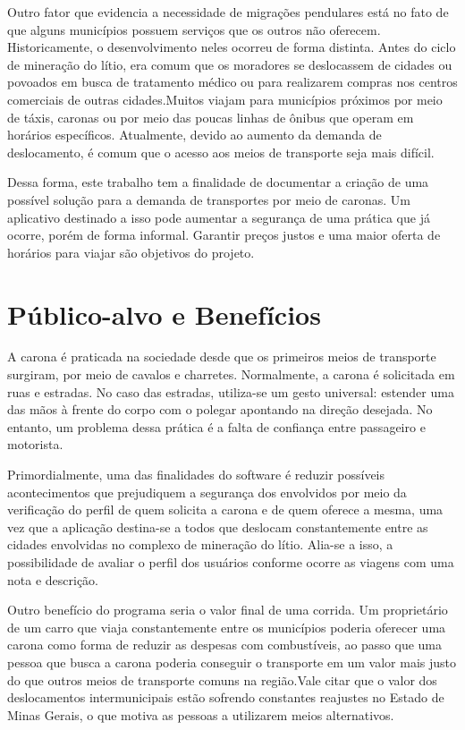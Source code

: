 Outro fator que evidencia a necessidade de migrações pendulares está no fato de que alguns municípios possuem serviços que os outros não oferecem. Historicamente, o desenvolvimento neles ocorreu de forma distinta. Antes do ciclo de mineração do lítio, era comum que os moradores se deslocassem de cidades ou povoados em busca de tratamento médico ou para realizarem compras nos centros comerciais de outras cidades.Muitos viajam para municípios próximos por meio de táxis, caronas ou por meio das poucas linhas de ônibus que operam em horários específicos. Atualmente, devido ao aumento da demanda de deslocamento, é comum que o acesso aos meios de transporte seja mais difícil. 

Dessa forma, este trabalho tem a finalidade de documentar a criação de uma possível solução para a demanda de transportes por meio de caronas. Um aplicativo destinado a isso pode aumentar a segurança de uma prática que já ocorre, porém de forma informal. Garantir preços justos e uma maior oferta de horários para viajar são objetivos do projeto.

\section{Público-alvo e Benefícios}

A carona é praticada na sociedade desde que os primeiros meios de transporte surgiram, por meio de cavalos e charretes. Normalmente, a carona é solicitada em ruas e estradas. No caso das estradas, utiliza-se um gesto universal: estender uma das mãos à frente do corpo com o polegar apontando na direção desejada. No entanto, um problema dessa prática é a falta de confiança entre passageiro e motorista.

Primordialmente, uma das finalidades do software é reduzir possíveis acontecimentos que prejudiquem a segurança dos envolvidos por meio da verificação do perfil de quem solicita a carona e de quem oferece a mesma, uma vez que a aplicação destina-se a todos que deslocam constantemente entre as cidades envolvidas no complexo de mineração do lítio. Alia-se a isso, a possibilidade de avaliar o perfil dos usuários conforme ocorre as viagens com uma nota e descrição. 

Outro benefício do programa seria o valor final de uma corrida. Um proprietário de um carro que viaja constantemente entre os municípios poderia oferecer uma carona como forma de reduzir as despesas com combustíveis, ao passo que uma pessoa que busca a carona poderia conseguir o transporte em um valor mais justo do que outros meios de transporte comuns na região.Vale citar que o valor dos deslocamentos intermunicipais estão sofrendo constantes reajustes no Estado de Minas Gerais, o que motiva as pessoas a utilizarem meios alternativos. 

